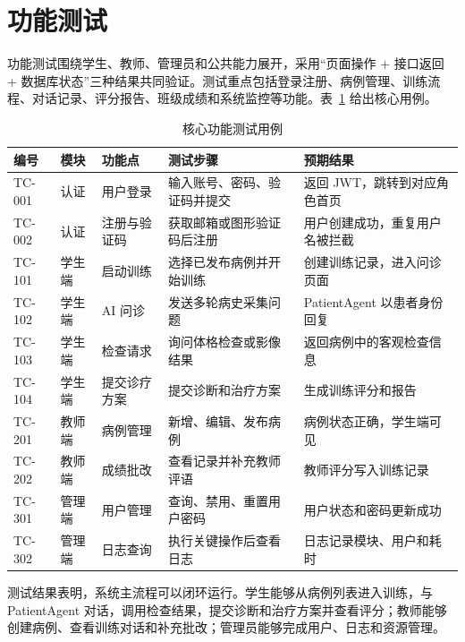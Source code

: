 \section{功能测试}

功能测试围绕学生、教师、管理员和公共能力展开，采用“页面操作 + 接口返回 + 数据库状态”三种结果共同验证。测试重点包括登录注册、病例管理、训练流程、对话记录、评分报告、班级成绩和系统监控等功能。表~\ref{tab:function_test} 给出核心用例。

\begin{table}[H]
    \centering
    \caption{核心功能测试用例}
    \label{tab:function_test}
    \small
    \begin{tabularx}{\textwidth}{@{}l l l l X@{}}
        \toprule
        编号 & 模块 & 功能点 & 测试步骤 & 预期结果 \\
        \midrule
        TC-001 & 认证 & 用户登录 & 输入账号、密码、验证码并提交 & 返回 JWT，跳转到对应角色首页 \\
        TC-002 & 认证 & 注册与验证码 & 获取邮箱或图形验证码后注册 & 用户创建成功，重复用户名被拦截 \\
        TC-101 & 学生端 & 启动训练 & 选择已发布病例并开始训练 & 创建训练记录，进入问诊页面 \\
        TC-102 & 学生端 & AI 问诊 & 发送多轮病史采集问题 & PatientAgent 以患者身份回复 \\
        TC-103 & 学生端 & 检查请求 & 询问体格检查或影像结果 & 返回病例中的客观检查信息 \\
        TC-104 & 学生端 & 提交诊疗方案 & 提交诊断和治疗方案 & 生成训练评分和报告 \\
        TC-201 & 教师端 & 病例管理 & 新增、编辑、发布病例 & 病例状态正确，学生端可见 \\
        TC-202 & 教师端 & 成绩批改 & 查看记录并补充教师评语 & 教师评分写入训练记录 \\
        TC-301 & 管理端 & 用户管理 & 查询、禁用、重置用户密码 & 用户状态和密码更新成功 \\
        TC-302 & 管理端 & 日志查询 & 执行关键操作后查看日志 & 日志记录模块、用户和耗时 \\
        \bottomrule
    \end{tabularx}
\end{table}

测试结果表明，系统主流程可以闭环运行。学生能够从病例列表进入训练，与 PatientAgent 对话，调用检查结果，提交诊断和治疗方案并查看评分；教师能够创建病例、查看训练对话和补充批改；管理员能够完成用户、日志和资源管理。

